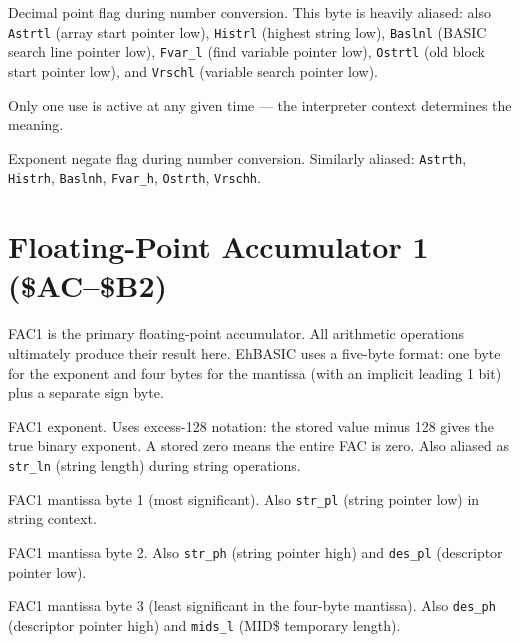 
Decimal point flag during number conversion.  This byte is heavily aliased:
also \texttt{Astrtl} (array start pointer low), \texttt{Histrl} (highest
string low), \texttt{Baslnl} (BASIC search line pointer low),
\texttt{Fvar\_l} (find variable pointer low), \texttt{Ostrtl} (old block
start pointer low), and \texttt{Vrschl} (variable search pointer low).

Only one use is active at any given time --- the interpreter context determines
the meaning.


Exponent negate flag during number conversion.  Similarly aliased:
\texttt{Astrth}, \texttt{Histrh}, \texttt{Baslnh}, \texttt{Fvar\_h},
\texttt{Ostrth}, \texttt{Vrschh}.

\section{Floating-Point Accumulator 1 (\$AC--\$B2)}

FAC1 is the primary floating-point accumulator.  All arithmetic operations
ultimately produce their result here.  EhBASIC uses a five-byte format: one
byte for the exponent and four bytes for the mantissa (with an implicit
leading 1 bit) plus a separate sign byte.


FAC1 exponent.  Uses excess-128 notation: the stored value minus 128 gives the
true binary exponent.  A stored zero means the entire FAC is zero.  Also
aliased as \texttt{str\_ln} (string length) during string operations.


FAC1 mantissa byte 1 (most significant).  Also \texttt{str\_pl} (string
pointer low) in string context.


FAC1 mantissa byte 2.  Also \texttt{str\_ph} (string pointer high) and
\texttt{des\_pl} (descriptor pointer low).


FAC1 mantissa byte 3 (least significant in the four-byte mantissa).  Also
\texttt{des\_ph} (descriptor pointer high) and \texttt{mids\_l} (MID\$
temporary length).

